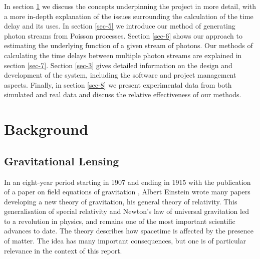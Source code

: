 \documentclass[a4paper,11pt]{article}
\begin{document}
  In section \ref{sec-2} we discuss the concepts underpinning the project in more
  detail, with a more in-depth explanation of the issues surrounding the
  calculation of the time delay and its uses. In section \ref{sec-5} we introduce our method of generating photon streams from Poisson
  processes. Section \ref{sec-6} shows our approach to estimating the
  underlying function of a given stream of photons. Our methods of calculating the
  time delays between multiple photon streams are explained in section \ref{sec-7}. Section \ref{sec-3} gives detailed information on the design and
  development of the system, including the software and project management
  aspects. Finally, in section \ref{sec-8} we present experimental data from both
  simulated and real data and discuss the relative effectiveness of our methods.
\section{Background}
\label{sec-2}
\subsection{Gravitational Lensing}
\label{sec-2-1}

   In an eight-year period starting in 1907 and ending in 1915 with the
   publication of a paper on field equations of gravitation
   \cite{einstein1915general}, Albert Einstein wrote many papers developing a
   new theory of gravitation, his general theory of relativity. This
   generalisation of special relativity and Newton's law of universal
   gravitation led to a revolution in physics, and remains one of the most
   important scientific advances to date. The theory describes how spacetime is
   affected by the presence of matter. The idea has many important consequences,
   but one is of particular relevance in the context of this report.
\end{document}
